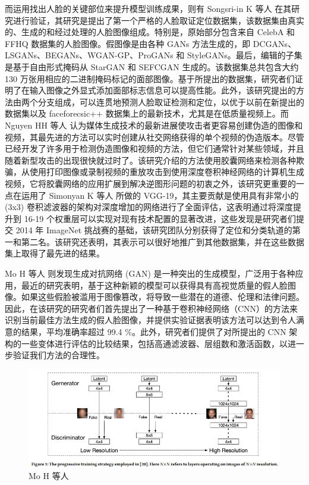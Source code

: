 而运用找出人脸的关键部位来提升模型训练成果，则有 Songsri-in K 等人 \cite{songsri2019complement} 在其研究进行验证，其研究是提出了第一个严格的人脸取证定位数据集，该数据集由真实的、生成的和经过处理的人脸图像组成。特别是，原始部分包含来自 CelebA 和 FFHQ 数据集的人脸图像。假图像是由各种 GANs 方法生成的，即 DCGANs、LSGANs、BEGANs、WGAN-GP、ProGANs 和 StyleGANs。最后，编辑的子集是基于自由形式掩码从 StarGAN 和 SEFCGAN 生成的。该数据集总共包含大约 130 万张用相应的二进制掩码标记的面部图像。基于所提出的数据集，研究者们证明了在输入图像之外显式添加面部标志信息可以提高性能。此外，该研究提出的方法由两个分支组成，可以连贯地预测人脸取证检测和定位，以优于以前在新提出的数据集以及 faceforecsic++ 数据集上的最新技术，尤其是在低质量视频上。而 Nguyen HH 等人 \cite{nguyen2019capsule} 认为媒体生成技术的最新进展使攻击者更容易创建伪造的图像和视频，其最先进的方法可以实时创建从社交网络获得的单个视频的伪造版本。尽管已经开发了许多用于检测伪造图像和视频的方法，但它们通常针对某些领域，并且随着新型攻击的出现很快就过时了。该研究介绍的方法使用胶囊网络来检测各种欺骗，从使用打印图像或录制视频的重放攻击到使用深度卷积神经网络的计算机生成视频，它将胶囊网络的应用扩展到解决逆图形问题的初衷之外，该研究更重要的一点在运用了 Simonyan K 等人 \cite{simonyan2014very} 所做的 VGG-19，其主要贡献是使用具有非常小的 (3x3) 卷积滤波器的架构对深度增加的网络进行了全面评估，这表明通过将深度提升到 16-19 个权重层可以实现对现有技术配置的显著改进，这些发现是研究者们提交 2014 年 ImageNet 挑战赛的基础，该研究团队分别获得了定位和分类轨道的第一和第二名。该研究还表明，其表示可以很好地推广到其他数据集，并在这些数据集上取得了最先进的结果。

Mo H 等人 \cite{mo2018fake} 则发现生成对抗网络 (GAN) 是一种突出的生成模型，广泛用于各种应用，最近的研究表明，基于这种新颖的模型可以获得具有高视觉质量的假人脸图像。如果这些假脸被滥用于图像篡改，将导致一些潜在的道德、伦理和法律问题。因此，在该研究的研究者们首先提出了一种基于卷积神经网络（CNN）的方法来识别当前最佳方法生成的假人脸图像，并提供实验证据表明该方法可以达到令人满意的结果，平均准确率超过 99.4 \%。此外，研究者们提供了对所提出的 CNN 架构的一些变体进行评估的比较结果，包括高通滤波器、层组数和激活函数，以进一步验证我们方法的合理性。

\begin{figure}[htb]
\centering 
\includegraphics[width=1.05\textwidth]{img/ch3m13.png} 
\caption{Mo H 等人 \cite{mo2018fake}}
\label{Test}
\end{figure}

